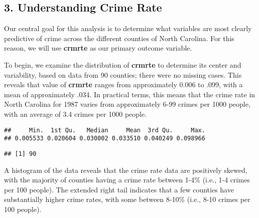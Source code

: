 \documentclass[]{article}
\newenvironment{Shaded}{\begin{snugshade}}{\end{snugshade}}
\newcommand{\KeywordTok}[1]{\textcolor[rgb]{0.13,0.29,0.53}{\textbf{#1}}}
\newcommand{\DataTypeTok}[1]{\textcolor[rgb]{0.13,0.29,0.53}{#1}}
\newcommand{\StringTok}[1]{\textcolor[rgb]{0.31,0.60,0.02}{#1}}
\newcommand{\OperatorTok}[1]{\textcolor[rgb]{0.81,0.36,0.00}{\textbf{#1}}}
\newcommand{\NormalTok}[1]{#1}
\begin{document}
\subsection{3. Understanding Crime Rate}\label{understanding-crime-rate}

Our central goal for this analysis is to determine what variables are
most clearly predictive of crime across the different counties of North
Carolina. For this reason, we will use \textbf{crmrte} as our primary
outcome variable.

To begin, we examine the distribution of \textbf{crmrte} to determine
its center and variability, based on data from 90 counties; there were
no missing cases. This reveals that value of \textbf{crmrte} ranges from
approximately 0.006 to .099, with a mean of approximately .034. In
practical terms, this means that the crime rate in North Carolina for
1987 varies from approximately 6-99 crimes per 1000 people, with an
average of 3.4 crimes per 1000 people.

\begin{Shaded}
\end{Shaded}

\begin{verbatim}
##     Min.  1st Qu.   Median     Mean  3rd Qu.     Max. 
## 0.005533 0.020604 0.030002 0.033510 0.040249 0.098966
\end{verbatim}

\begin{Shaded}
\end{Shaded}

\begin{verbatim}
## [1] 90
\end{verbatim}

A histogram of the data reveals that the crime rate data are positively
skewed, with the majority of counties having a crime rate between 1-4\%
(i.e., 1-4 crimes per 100 people). The extended right tail indicates
that a few counties have substantially higher crime rates, with some
between 8-10\% (i.e., 8-10 crimes per 100 people).

\begin{Shaded}
\end{Shaded}
\end{document}

